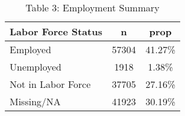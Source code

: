 \documentclass{article}
\begin{document}
\begin{table}[ht]
\centering
\caption*{Table 3: Employment Summary}
\begin{tabular}{lcc}
  \hline
  Labor Force Status & n & prop \\ 
  \hline
  Employed & 57304 & 41.27\% \\ 
  Unemployed & 1918 & 1.38\% \\ 
  Not in Labor Force & 37705 & 27.16\% \\ 
  Missing/NA  & 41923 & 30.19\% \\ 
   \hline
\end{tabular}
\end{table}
\end{document}
